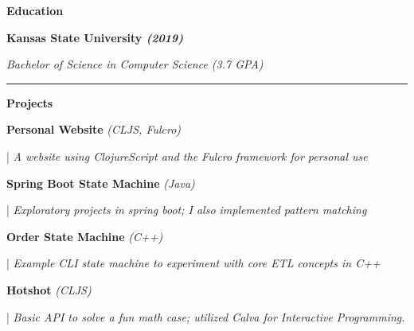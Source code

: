 \documentclass[letterpaper,11pt]{article}
\begin{document}
\textbf{\large \textcolor{magic_blue}{Education}}

\begin{minipage}[t]{0.45\textwidth}
  \raggedright
  \textbf{ Kansas State University \textit{(2019)}} \\
\end{minipage}
\hfill
\begin{minipage}[t]{0.45\textwidth}
  \raggedleft
  \textit{Bachelor of Science in Computer Science (3.7 GPA)} \\
\end{minipage}
\noindent\rule{19.5cm}{0.4pt}

\textbf{\large \textcolor{magic_blue}{Projects}}

\begin{minipage}[t]{0.28\textwidth}
  \raggedright
  \textbf{ Personal Website }\textit{(CLJS, Fulcro)} \\
\end{minipage}
\hfill
\begin{minipage}[t]{0.70\textwidth}
  \raggedright
  |\textit{ A website using ClojureScript and the Fulcro framework for personal use} \\
\end{minipage}

\begin{minipage}[t]{0.28\textwidth}
  \raggedright
  \textbf{ Spring Boot State Machine }\textit{(Java)} \\
\end{minipage}
\hfill
\begin{minipage}[t]{0.70\textwidth}
  \raggedright
  |\textit{ Exploratory projects in spring boot; I also implemented pattern matching } \\
\end{minipage}

\begin{minipage}[t]{0.28\textwidth}
  \raggedright
  \textbf{ Order State Machine }\textit{(C++)}\\
\end{minipage}
\hfill
\begin{minipage}[t]{0.70\textwidth}
  \raggedright
  |\textit{ Example CLI state machine to experiment with core ETL concepts in C++ } \\
\end{minipage}

\begin{minipage}[t]{0.28\textwidth}
  \raggedright
  \textbf{ Hotshot }\textit{(CLJS)}\\
\end{minipage}
\hfill
\begin{minipage}[t]{0.70\textwidth}
  \raggedright
  |\textit{ Basic API to solve a fun math case; utilized Calva for Interactive Programming.  } \\
\end{minipage}
\end{document}
